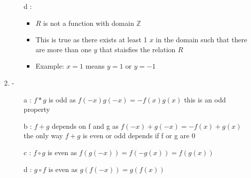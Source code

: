 \documentclass{article}
\begin{document}
\begin{enumerate}
\begin{itemize}
        \item [d] : 
        \begin{itemize}
            \item $R$ is not a function with domain $\mathbb{Z}$
            \item This is true as there exists at least 1 $x$ in the domain such that there are more than one $y$ that staisfies the relation $R$
            \item Example: $x = 1 $ means $y = 1 $ or $y = -1 $
        \end{itemize}
    \end{itemize}
    \item - 
    \begin{itemize}
        \item [a]: $f * g$ is odd as $f(-x)g(-x) = -f(x)g(x)$ this is an odd property
        \item [b]: $f+g$ depends on f and g as $f(-x)+ g(-x) = -f(x)+g(x)$ the only way $ f+g$ is even or odd depends if f or g are 0 
        \item [c]: $f \circ g $ is even as $f(g(-x)) = f(-g(x)) = f(g(x))$
        \item [d]: $g \circ f $ is even as $g(f(-x)) = g(f(x)) $
    \end{itemize}
\end{enumerate}
\end{document}
